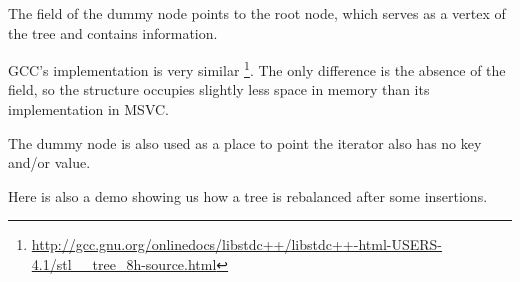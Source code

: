 The  field of the dummy node points to the root node, which serves
as a vertex of the tree and contains information.






GCC's implementation is very similar
\footnote{\url{http://gcc.gnu.org/onlinedocs/libstdc++/libstdc++-html-USERS-4.1/stl__tree_8h-source.html}}.
The only difference is the absence of the  field,
so the structure occupies slightly less space in memory than its implementation in MSVC.

The dummy node is also used as a place to point the  iterator also has no key and/or value.


Here is also a demo showing us how a tree is rebalanced after some insertions.





